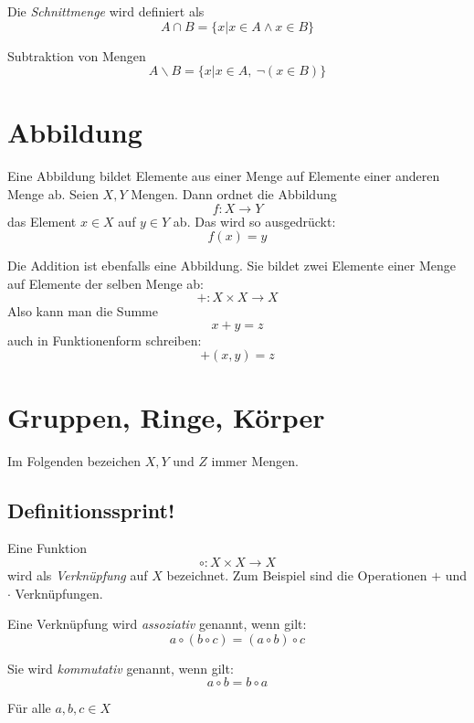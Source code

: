 \begin{definition}
Die \emph{Schnittmenge} wird definiert als 
\[A \cap B = \{x| x\in A \wedge x\in B \} \]
\end{definition}

\begin{definition}
Subtraktion von Mengen
\[ A \backslash B = \{ x \vert x\in A, \  \neg (x\in B) \} \]
\end{definition}

\section{Abbildung}
Eine Abbildung bildet Elemente aus einer Menge auf Elemente einer anderen Menge ab. Seien $X,Y$ Mengen. Dann ordnet die Abbildung
\[ f : X \longrightarrow Y \]
das Element $x\in X$ auf $y\in Y$ ab. Das wird so ausgedrückt:
\[ f(x) = y\]

Die Addition ist ebenfalls eine Abbildung. Sie bildet zwei Elemente einer Menge auf Elemente der selben Menge ab:
\[ + : X \times X \longrightarrow X \]
Also kann man die Summe 
\[ x+y = z\]
auch in Funktionenform schreiben:
\[ +(x,y) = z\]

\section{Gruppen, Ringe, Körper}
Im Folgenden bezeichen $X,Y$ und $Z$ immer Mengen.

\subsection{Definitionssprint!}

\begin{definition}
Eine Funktion 
\[ \circ : X \times X \longrightarrow X \]
wird als \emph{Verknüpfung} auf $X$ bezeichnet. Zum Beispiel sind die Operationen $+$ und $\cdot$ Verknüpfungen. 
\end{definition}

\begin{definition} 
Eine Verknüpfung wird \emph{assoziativ} genannt, wenn gilt:
\[ a \circ (b \circ c) = (a \circ b) \circ c \]
\end{definition}
\begin{definition}
Sie wird \emph{kommutativ} genannt, wenn gilt: 
\[ a \circ b = b \circ a \]
\end{definition}
\noindent Für alle $a,b,c \in X$

